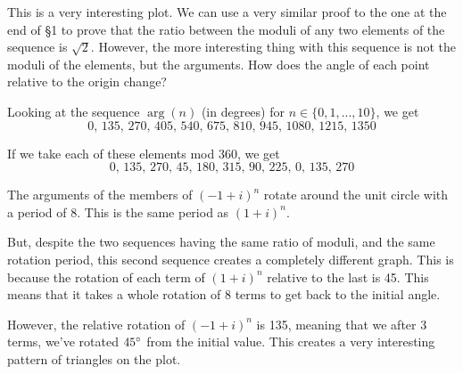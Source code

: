 \documentclass[a4paper]{article}
\newcommand{\opi}{(1 + i)}
\newcommand{\mopi}{(-1 + i)}
\begin{document}
This is a very interesting plot. We can use a very similar proof to the one at the end of \S1 to prove that the ratio between the moduli of any two elements of the sequence is $\sqrt{2}$. However, the more interesting thing with this sequence is not the moduli of the elements, but the arguments. How does the angle of each point relative to the origin change?

Looking at the sequence $\arg(n)$ (in degrees) for $n \in \{0,1,...,10\}$, we get
$$\text{0, 135, 270, 405, 540, 675, 810, 945, 1080, 1215, 1350}$$

If we take each of these elements mod 360, we get
$$\text{0, 135, 270, 45, 180, 315, 90, 225, 0, 135, 270}$$

The arguments of the members of $\mopi^n$ rotate around the unit circle with a period of 8. This is the same period as $\opi^n$.

But, despite the two sequences having the same ratio of moduli, and the same rotation period, this second sequence creates a completely different graph. This is because the rotation of each term of $\opi^n$ relative to the last is 45. This means that it takes a whole rotation of 8 terms to get back to the initial angle.

However, the relative rotation of $\mopi^n$ is 135, meaning that we after 3 terms, we've rotated $45\degree$ from the initial value. This creates a very interesting pattern of triangles on the plot.
\end{document}
